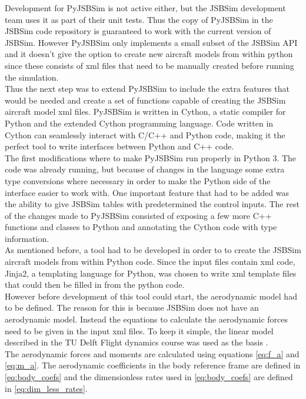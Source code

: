 Development for PyJSBSim is not active either, but the JSBSim development team uses it as part of their unit tests. Thus the copy of PyJSBSim in the JSBSim code repository is guaranteed to work with the current version of JSBSim. However PyJSBSim only implements a small subset of the JSBSim API and it doesn't give the option to create new aircraft models from within python since these consists of \gls{xml} files that need to be manually created before running the simulation. \\

Thus the next step was to extend PyJSBSim to include the extra features that would be needed and create a set of functions capable of creating the JSBSim aircraft model \gls{xml} files. PyJSBSim is written in Cython, a static compiler for Python and the extended Cython programming language. Code written in Cython can seamlessly interact with C/C++ and Python code, making it the perfect tool to write interfaces between Python and C++ code. \\

The first modifications where to make PyJSBSim run properly in Python 3. The code was already running, but because of changes in the language some extra type conversions where necessary in order to make the Python side of the interface easier to work with. One important feature that had to be added was the ability to give JSBSim tables with predetermined the control inputs. The rest of the changes made to PyJSBSim consisted of exposing a few more C++ functions and classes to Python and annotating the Cython code with type information.\\

As mentioned before, a tool had to be developed in order to to create the JSBSim aircraft models from within Python code. Since the input files contain \gls{xml} code, Jinja2, a templating language for Python, was chosen to write \gls{xml} template files that could then be filled in from the python code. \\

However before development of this tool could start, the aerodynamic model had to be defined. The reason for this is because JSBSim does not have an aerodynamic model. Instead the equations to calculate the aerodynamic forces need to be given in the input \gls{xml} files. To keep it simple, the linear model described in the TU Delft Flight dynamics course was used as the basis \cite{fdreader}. \\

The aerodynamic forces and moments are calculated using equations \autoref{eq:f_a} and \autoref{eq:m_a}. The aerodynamic coefficients in the body reference frame are defined in \autoref{eq:body_coefs} and the dimensionless rates used in \autoref{eq:body_coefs} are defined in \autoref{eq:dim_less_rates}.


